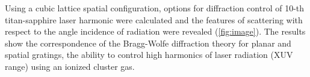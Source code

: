 Using a cubic lattice spatial configuration, options for diffraction control of 10-th titan-sapphire laser harmonic were calculated and the features of scattering with respect to the angle incidence of radiation were revealed (\autoref{fig:image}). The results show the correspondence of the Bragg-Wolfe diffraction theory for planar and spatial gratings, the ability to control high harmonics of laser radiation (XUV range) using an ionized cluster gas.



